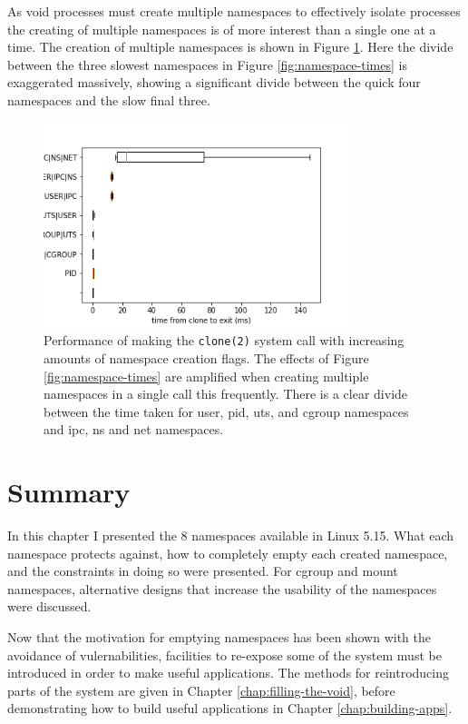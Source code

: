 \documentclass[12pt,a4paper,twoside]{report}
\begin{document}
As void processes must create multiple namespaces to effectively isolate processes the creating of multiple namespaces is of more interest than a single one at a time. The creation of multiple namespaces is shown in Figure \ref{fig:namespace-stacked-times}. Here the divide between the three slowest namespaces in Figure \ref{fig:namespace-times} is exaggerated massively, showing a significant divide between the quick four namespaces and the slow final three. 

\begin{figure}
    \centering
    \includegraphics[width=0.8\textwidth]{graphs/clone_stacked_namespaces.png}

    \caption{Performance of making the \texttt{clone(2)} system call with increasing amounts of namespace creation flags. The effects of Figure \ref{fig:namespace-times} are amplified when creating multiple namespaces in a single call this frequently. There is a clear divide between the time taken for user, pid, uts, and cgroup namespaces and ipc, ns and net namespaces.}
    \label{fig:namespace-stacked-times}
\end{figure}

\section{Summary}

In this chapter I presented the 8 namespaces available in Linux 5.15. What each namespace protects against, how to completely empty each created namespace, and the constraints in doing so were presented. For cgroup and mount namespaces, alternative designs that increase the usability of the namespaces were discussed.

Now that the motivation for emptying namespaces has been shown with the avoidance of vulernabilities, facilities to re-expose some of the system must be introduced in order to make useful applications. The methods for reintroducing parts of the system are given in Chapter \ref{chap:filling-the-void}, before demonstrating how to build useful applications in Chapter \ref{chap:building-apps}.
\end{document}
